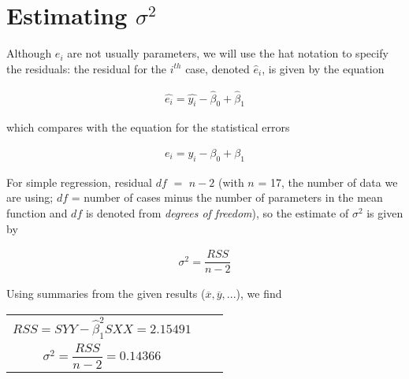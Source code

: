 \documentclass{article}
\begin{document}
\section{Estimating $\sigma ^ {2}$}

    Although ${e}_{i}$ are not usually parameters, we will use the hat notation to specify the residuals: the residual for the $i^{th}$ case, denoted $\hat{e}_{i}$, is given by the equation
    
    \begin{align} 
        \hat{e _{i}} = \hat{y_{i}} - \hat\beta_{0} + \hat\beta_{1} 
    \end{align}
    
    which compares with the equation for the statistical errors
    
    \begin{align} 
        {e _{i}} = {y_{i}} - \beta_{0} + \beta_{1} 
    \end{align}
    
    
    For simple regression, residual $df$ $=$ $n - 2$ (with $n$ = 17, the number of data we are using; $df$ = number of cases minus the number of parameters in the mean function and $df$ is denoted from \textit{degrees of freedom}), so the estimate of $\sigma ^ 2$ is given by
    
    \begin{align} 
        {\sigma^2} = \dfrac{RSS}{n-2}
    \end{align}
    
    Using summaries from the given results ($\overline{x}, \overline{y}, ...$), we find
        
    \begin{center}
        \begin{tabular}{c c c}
            $RSS = SYY - \hat\beta_{1}^2 SXX = 2.15491$ \\
            $\sigma^2 = \dfrac{RSS}{n - 2} = 0.14366$
        \end{tabular}
    \end{center}
    
\end{document}
